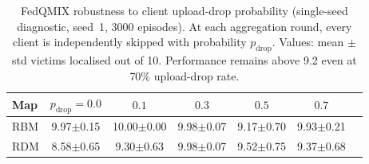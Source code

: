 \begin{table}[t]
\centering
\caption{FedQMIX robustness to client upload-drop probability (single-seed diagnostic,
seed~1, 3000 episodes). At each aggregation round, every client is independently
skipped with probability $p_{\mathrm{drop}}$. Values: mean $\pm$ std victims
localised out of 10. Performance remains above 9.2 even at 70\% upload-drop rate.}
\label{tab:partial_fedavg}
\small
\begin{tabular}{lcccccc}
\toprule
Map & $p_{\mathrm{drop}}=0.0$ & $0.1$ & $0.3$ & $0.5$ & $0.7$ \\
\midrule
RBM & 9.97$\pm$0.15 & 10.00$\pm$0.00 & 9.98$\pm$0.07 & 9.17$\pm$0.70 & 9.93$\pm$0.21 \\
RDM & 8.58$\pm$0.65 & 9.30$\pm$0.63 & 9.98$\pm$0.07 & 9.52$\pm$0.75 & 9.37$\pm$0.68 \\
\bottomrule
\end{tabular}
\end{table}
